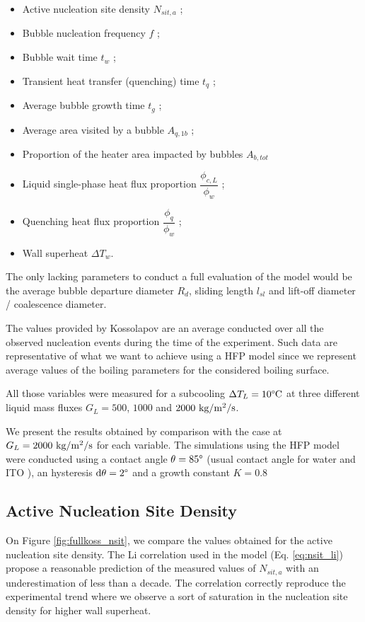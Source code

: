 \begin{itemize}
\item Active nucleation site density $N_{sit,a}$ ;
\item Bubble nucleation frequency $f$ ;
\item Bubble wait time $t_{w}$ ;
\item Transient heat transfer (quenching) time $t_{q}$ ;
\item Average bubble growth time $t_{g}$ ;
\item Average area visited by a bubble $A_{q,1b}$ ;
\item Proportion of the heater area impacted by bubbles $A_{b,tot}$
\item Liquid single-phase heat flux proportion $\dfrac{\phi_{c,L}}{\phi_{w}}$ ;
\item Quenching heat flux proportion $\dfrac{\phi_{q}}{\phi_{w}}$ ;
\item Wall superheat $\Delta T_{w}$.
\end{itemize}

The only lacking parameters to conduct a full evaluation of the model would be the average bubble departure diameter $R_{d}$, sliding length $l_{sl}$ and lift-off diameter / coalescence diameter.

The values provided by Kossolapov are an average conducted over all the observed nucleation events during the time of the experiment. Such data are representative of what we want to achieve using a HFP model since we represent average values of the boiling parameters for the considered boiling surface.

\npar

All those variables were measured for a subcooling $\Delta T_{L} = 10\degree\mathrm{C}$ at three different liquid mass fluxes $G_{L} = 500$, $1000$ and $2000~\text{kg/m$^{2}$/s}$. 

\npar

We present the results obtained by comparison with the case at $G_{L} = 2000\ \text{kg/m$^{2}$/s}$ for each variable. The simulations using the HFP model were conducted using a contact angle $\theta = 85 \degree$ (usual contact angle for water and ITO \cite{kossolapov_experimental_2021}), an hysteresis $\mathrm{d}\theta = 2 \degree$ and a growth constant $K=0.8$

 
\subsection{Active Nucleation Site Density}

On Figure \ref{fig:fullkoss_nsit}, we compare the values obtained for the active nucleation site density. The Li \etal correlation used in the model (Eq. \ref{eq:nsit_li}) propose a reasonable prediction of the measured values of $N_{sit,a}$ with an underestimation of less than a decade. The correlation correctly reproduce the experimental trend where we observe a sort of saturation in the nucleation site density for higher wall superheat.

